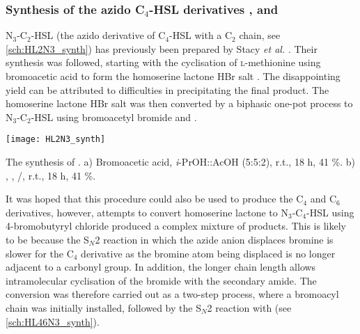 \subsubsection{Synthesis of the azido C$_4$-HSL derivatives ,  and  \label{sec:HSLs}}

N$_3$-C$_2$-HSL  (the azido derivative of C$_4$-HSL with a C$_2$ chain, see \ref{sch:HL2N3_synth}) has previously been prepared by Stacy \textit{et al.} \cite{Stacy2013}. Their synthesis was followed, starting with the cyclisation of \textsc{l}-methionine  using bromoacetic acid to form the homoserine lactone HBr salt . The disappointing yield can be attributed to difficulties in precipitating the final product. The homoserine lactone HBr salt  was then converted by a biphasic one-pot process to N$_3$-C$_2$-HSL  using bromoacetyl bromide  and . 

\begin{scheme}[H]
	\begin{center}
		\texttt{[image: HL2N3\_synth]}
		\caption{The synthesis of .
		a) Bromoacetic acid, \textit{i}-PrOH::AcOH (5:5:2), r.t., 18 h, 41 \%.
		b) , , /, r.t., 18 h, 41 \%.
		\label{sch:HL2N3_synth}}
	\end{center}
\end{scheme}

It was hoped that this procedure could also be used to produce the C$_4$ and C$_6$ derivatives, however, attempts to convert homoserine lactone  to N$_3$-C$_4$-HSL  using 4-bromobutyryl chloride  produced a complex mixture of products. This is likely to be because the S$_N$2 reaction in which the azide anion displaces bromine is slower for the C$_4$ derivative as the bromine atom being displaced is no longer adjacent to a carbonyl group. In addition, the longer chain length allows intramolecular cyclisation of the bromide with the secondary amide. 
The conversion was therefore carried out as a two-step process, where a bromoacyl chain was initially installed, followed by the S$_N$2 reaction with  (see \ref{sch:HL46N3_synth}). 


